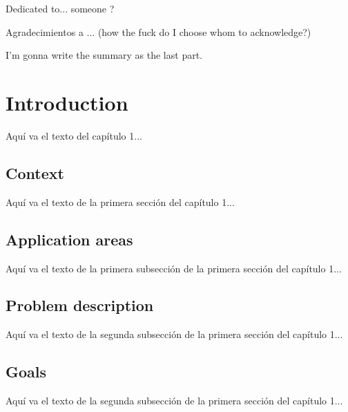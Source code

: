 \documentclass{iccmemoria}
\author{Erik Andrés Regla Torres}
\date{mes, año}
\begin{document}
\maketitle

\begin{dedicatory}
  Dedicated to... someone ?
\end{dedicatory}

\begin{acknowledgment}
  Agradecimientos a ... (how the fuck do I choose whom to acknowledge?)
\end{acknowledgment}

\tableofcontents
\listoffigures
\listoftables

\begin{resumen}
  I'm gonna write the summary as the last part.
\end{resumen}


\chapter{Introduction}
Aquí va el texto del capítulo 1...

\section{Context}
Aquí va el texto de la primera sección del capítulo 1...

\section{Application areas}
Aquí va el texto de la primera subsección de la primera sección del capítulo 1...

\section{Problem description}
Aquí va el texto de la segunda subsección de la primera sección del capítulo 1...

\section{Goals}
Aquí va el texto de la segunda subsección de la primera sección del capítulo 1...
\end{document}
